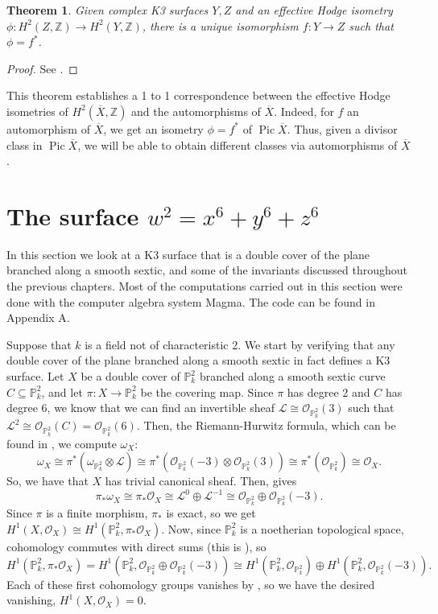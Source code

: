 \documentclass[12pt,twoside]{reedthesis}
\theoremstyle{plain}
\newtheorem{theorem}{Theorem}[chapter]
\theoremstyle{definition}
\theoremstyle{remark}
\newcommand{\ZZ}{\mathbb{Z}}
\newcommand{\Proj}{\mathbb{P}}
\newcommand{\calO}{\mathcal{O}}
\newcommand{\calL}{\mathcal{L}}
\newcommand{\Pic}{\operatorname{Pic}}
\begin{document}
\begin{theorem}
Given complex K3 surfaces $Y,Z$ and an effective Hodge isometry $\phi:H^2(Z,\ZZ)\to H^2(Y,\ZZ)$, there is a unique isomorphism $f:Y\to Z$ such that $\phi=f^*$.
\end{theorem}
\begin{proof}
See \cite[Theorem VIII.11.1 and Corollary VIII.11.4]{vanDeVen}.
\end{proof}
\noindent This theorem establishes a 1 to 1 correspondence between the effective Hodge isometries of $H^2(\overline{X},\ZZ)$ and the automorphisms of $\overline{X}$. Indeed, for $f$ an automorphism of $\overline{X}$, we get an isometry $\phi=f^*$ of $\Pic\overline{X}$. Thus, given a divisor class in $\Pic\overline{X}$, we will be able to obtain different classes via automorphisms of $\overline{X}$. 
\section{The surface $w^2=x^6+y^6+z^6$}\label{computation}
In this section we look at a K3 surface that is a double cover of the plane branched along a smooth sextic, and some of the invariants discussed throughout the previous chapters. Most of the computations carried out in this section were done with the computer algebra system Magma. The code can be found in Appendix A.

Suppose that $k$ is a field not of characteristic 2. We start by verifying that any double cover of the plane branched along a smooth sextic in fact defines a K3 surface. Let $X$ be a double cover of $\Proj^2_k$ branched along a smooth sextic curve $C\subseteq\Proj^2_k$, and let $\pi:X\to\Proj^2_k$ be the covering map. Since $\pi$ has degree 2 and $C$ has degree 6, we know that we can find an invertible sheaf $\calL\cong\calO_{\Proj^2_k}(3)$ such that $\calL^2\cong\calO_{\Proj^2_k}(C)=\calO_{\Proj^2_k}(6)$. Then, the Riemann-Hurwitz formula, which can be found in \cite[Lemma I.17.1]{vanDeVen}, we compute $\omega_X$:
\[
\omega_X\cong\pi^*(\omega_{\Proj^2_k}\otimes\calL)\cong\pi^*(\calO_{\Proj^2_k}(-3)\otimes\calO_{\Proj^2_k}(3))\cong\pi^*(\calO_{\Proj^2_k})\cong\calO_X.
\]
\noindent So, we have that $X$ has trivial canonical sheaf. Then, \cite[Lemma I.17.2]{vanDeVen} gives
\[
\pi_*\omega_X\cong\pi_*\calO_X\cong\calL^0\oplus\calL^{-1}\cong\calO_{\Proj^2_k}\oplus\calO_{\Proj^2_k}(-3).
\]
Since $\pi$ is a finite morphism, $\pi_*$ is exact, so we get $H^1(X,\calO_X)\cong H^1(\Proj^2_k,\pi_*\calO_X)$. Now, since $\Proj^2_k$ is a noetherian topological space, cohomology commutes with direct sums (this is \cite[Proposition III.2.9]{hartshorne}), so 
\[
H^1(\Proj^2_k,\pi_*\calO_X)=H^1(\Proj^2_k,\calO_{\Proj^2_k}\oplus\calO_{\Proj^2_k}(-3))\cong H^1(\Proj^2_k,\calO_{\Proj^2_k})\oplus H^1(\Proj^2_k,\calO_{\Proj^2_k}(-3)).
\]
Each of these first cohomology groups vanishes by \cite[Theorem III.5.1]{hartshorne}, so we have the desired vanishing, $H^1(X,\calO_X)=0$.
\end{document}
